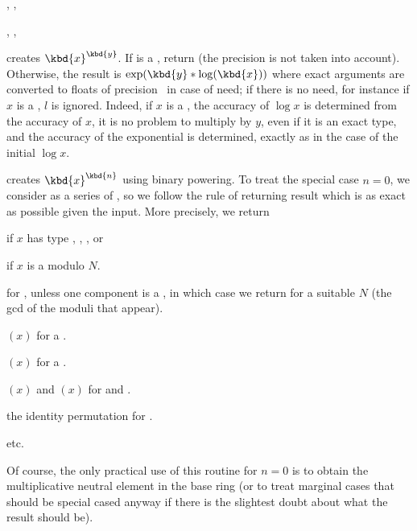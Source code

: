 , ,

, ,


 creates $\kbd{x}^{\kbd{y}}$. If
 is a , return  (the precision  is not
taken into account). Otherwise, the result is $\exp(\kbd{y}*\log(\kbd{x}))$
where exact arguments are converted to floats of precision~ in case of
need; if there is no need, for instance if $x$ is a , $l$ is
ignored. Indeed, if $x$ is a , the accuracy of $\log x$ is
determined from the accuracy of $x$, it is no problem to multiply by $y$,
even if it is an exact type, and the accuracy of the exponential is
determined, exactly as in the case of the initial $\log x$.

 creates $\kbd{x}^{\kbd{n}}$ using
binary powering. To treat the special case $n = 0$, we consider
 as a series of , so we follow the rule of returning
result which is as exact as possible given the input. More precisely,
we return

\item {} if $x$ has type , ,  , or

\item {} if $x$ is a  modulo $N$.

\item {} for ,  unless one component
is a , in which case we return  for a suitable
$N$ (the gcd of the moduli that appear).

\item {}$(x)$ for a .

\item {}$(x)$ for a .

\item {}$(x)$ and $(x)$ for  and .

\item the identity permutation for .

\item etc.

Of course, the only practical use of this routine for $n = 0$ is
to obtain the multiplicative neutral element in the base ring (or to treat
marginal cases that should be special cased anyway if there is the slightest
doubt about what the result should be).

